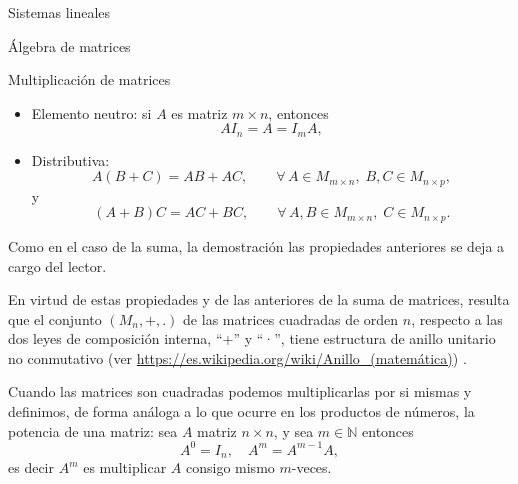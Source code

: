 \documentclass[a4paper,12pt,twoside,spanish]{amsbook}
\theoremstyle{definition}
\theoremstyle{remark}
\begin{document}
\begin{chapter}{Sistemas lineales}
\begin{section}{Álgebra de matrices}
\begin{subsection}{Multiplicación de matrices}
\begin{itemize}
					\item Elemento neutro: si  $A$ es matriz $m \times n$,  entonces
					\begin{equation*}
					AI_{n} = A = I_{m}A,
					\end{equation*}
					\item Distributiva:
					\begin{equation*}
					A(B + C) = AB + AC,\qquad \forall\, A \in M_{m \times n}, \;B, C \in M_{n \times p},
					\end{equation*}
					y
					\begin{equation*}
					(A+ B)C = AC + BC,\qquad \forall\, A, B \in M_{m \times n}, \; C \in M_{n \times p}.
					\end{equation*}
				\end{itemize}	
				
				Como en el caso de la suma,  la demostración las propiedades anteriores se deja a cargo del lector. 
				
				En virtud de estas propiedades y de las anteriores de la suma de matrices, resulta que el conjunto $(M_n ,+,.)$  de las matrices cuadradas de orden $n$, respecto a las dos leyes de composición interna, ``+'' y ``·'', tiene estructura de anillo unitario no conmutativo (ver \href{ https://es.wikipedia.org/wiki/Anillo\_(matemática)}{ https://es.wikipedia.org/wiki/Anillo\_(matemática)}) . 
				
				Cuando las matrices son cuadradas podemos multiplicarlas por si mismas y  definimos,  de forma análoga a lo que ocurre en los productos de números, la potencia de una matriz: sea $A$ matriz $n \times n$, y sea $m \in \mathbb N$ entonces
				\begin{equation*}
				A^0 = I_{n}, \quad A^m = A^{m-1}A,		
				\end{equation*}
				es decir $A^m$ es multiplicar $A$ consigo mismo $m$-veces.  
				

\end{subsection}
\end{section}
\end{chapter}
\end{document}

